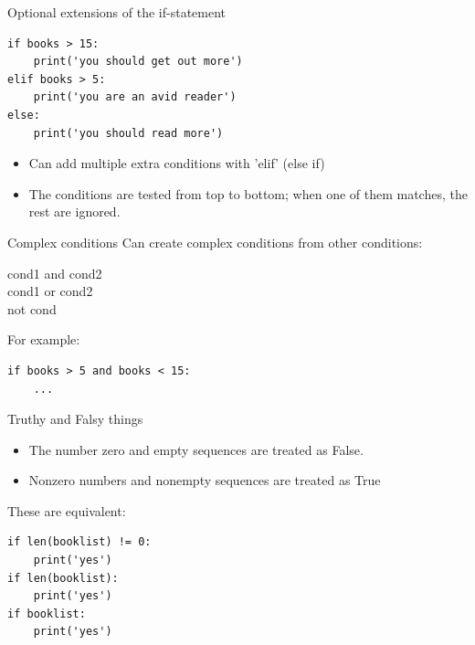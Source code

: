 \documentclass[aspectratio=169,usenames,dvipsnames]{beamer}
\begin{document}
\begin{frame}[fragile]{Optional extensions of the if-statement}
\begin{lstlisting}
if books > 15:
    print('you should get out more')
elif books > 5:
    print('you are an avid reader')
else:
    print('you should read more')
\end{lstlisting}

\begin{itemize}
    \item Can add multiple extra conditions with 'elif' (else if)
    \item The conditions are tested from top to bottom;
            when one of them matches, the rest are ignored.
\end{itemize}
\end{frame}


\begin{frame}[fragile]{Complex conditions}
    Can create complex conditions from other conditions:
    
    \begin{description}
        \item[cond1 and cond2]
        \item[cond1 or cond2]
        \item[not cond]
    \end{description}

    \pause
    For example:
\begin{lstlisting}
if books > 5 and books < 15:
    ...
\end{lstlisting}
\end{frame}

\begin{frame}[fragile]{Truthy and Falsy things}
\begin{itemize}
\item The number zero and empty sequences are treated as False.
\item Nonzero numbers and nonempty sequences are treated as True
\end{itemize}

These are equivalent:
\begin{lstlisting}
if len(booklist) != 0:
    print('yes')    
if len(booklist):
    print('yes')    
if booklist:
    print('yes')    
\end{lstlisting}

\end{frame}
\end{document}
